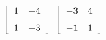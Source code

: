 {$\left[ \begin {array}{cc} 1&-4\\\noalign{\medskip}1&-3\end {array}
 \right]$ 
 }
{$\left[ \begin {array}{cc} -3&4\\\noalign{\medskip}-1&1\end {array}
 \right]$ }
